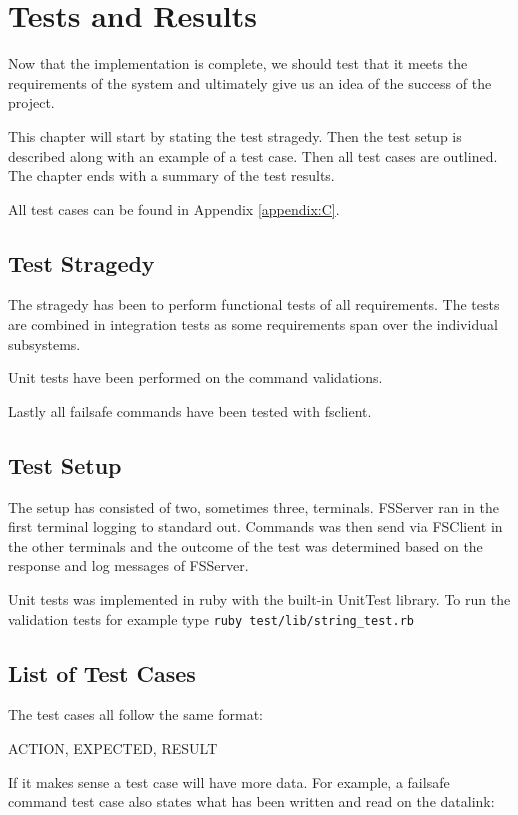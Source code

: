 \chapter{Tests and Results}
\label{chap:test}
Now that the implementation is complete, we should test that it meets the requirements of the system and ultimately give us an idea of the success of the project.

This chapter will start by stating the test stragedy. Then the test setup is described along with an example of a test case. Then all test cases are outlined. The chapter ends with a summary of the test results.

All test cases can be found in Appendix \ref{appendix:C}.

\section{Test Stragedy}
The stragedy has been to perform functional tests of all requirements. The tests are combined in integration tests as some requirements span over the individual subsystems.

Unit tests have been performed on the command validations.

Lastly all failsafe commands have been tested with fsclient.

\section{Test Setup}
The setup has consisted of two, sometimes three, terminals. FSServer ran in the first terminal logging to standard out. Commands was then send via FSClient in the other terminals and the outcome of the test was determined based on the response and log messages of FSServer.

Unit tests was implemented in ruby with the built-in UnitTest library. To run the validation tests for example type \texttt{ruby test/lib/string\_test.rb}

\section{List of Test Cases}
The test cases all follow the same format:

	ACTION, EXPECTED, RESULT

If it makes sense a test case will have more data. For example, a failsafe command test case also states what has been written and read on the datalink:

